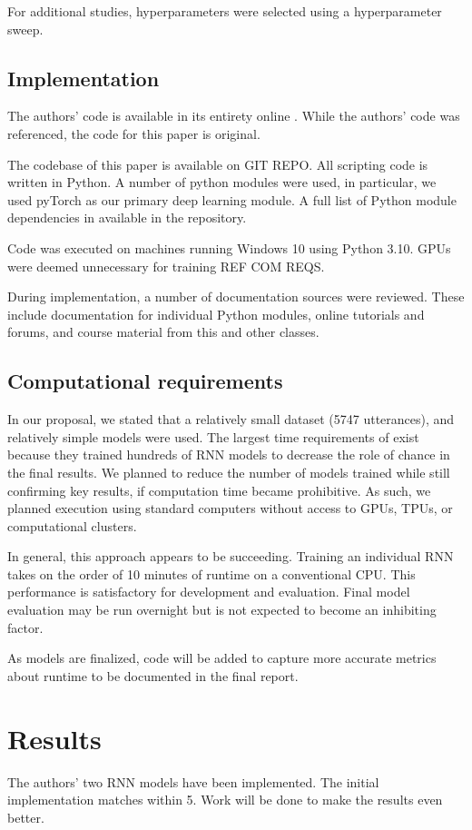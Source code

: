 \documentclass[11pt,a4paper]{article}
\begin{document}
For additional studies, hyperparameters were selected using a hyperparameter sweep. 

\subsection{Implementation}
The authors' code is available in its entirety online \citep{burger_2021_data}. While the authors' code was referenced, the code for this paper is original. 

The codebase of this paper is available on GIT REPO. All scripting code is written in Python. A number of python modules were used, in particular, we used pyTorch as our primary deep learning module. A full list of Python module dependencies in available in the repository. 

Code was executed on machines running Windows 10 using Python 3.10. GPUs were deemed unnecessary for training REF COM REQS. 

During implementation, a number of documentation sources were reviewed. These include documentation for individual Python modules, online tutorials and forums, and course material from this and other classes.  

\subsection{Computational requirements}

In our proposal, we stated that a relatively small dataset (5747 utterances), and relatively simple models were used. 
The largest time requirements of \citet{burger_2021} exist because they trained hundreds of RNN models to decrease the role of chance in the final results. We planned to reduce the number of models trained while still confirming key results, if computation time became prohibitive. As such, we planned execution using standard computers without access to GPUs, TPUs, or computational clusters. 

In general, this approach appears to be succeeding. Training an individual RNN takes on the order of 10 minutes of runtime on a conventional CPU. This performance is satisfactory for development and evaluation. Final model evaluation may be run overnight but is not expected to become an inhibiting factor. 

As models are finalized, code will be added to capture more accurate metrics about runtime to be documented in the final report. 

\section{Results}
The authors' two RNN models have been implemented. The initial implementation matches within 5. Work will be done to make the results even better. 
\end{document}
